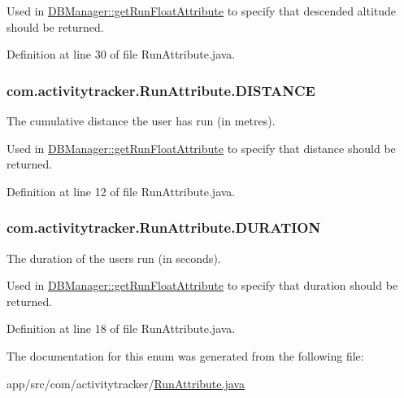 Used in \hyperlink{classcom_1_1activitytracker_1_1_d_b_manager_a666452f1e5862f90c06b0beb9a9fcfdd}{D\+B\+Manager\+::get\+Run\+Float\+Attribute} to specify that descended altitude should be returned. 

Definition at line 30 of file Run\+Attribute.\+java.

\subsubsection[{\texorpdfstring{D\+I\+S\+T\+A\+N\+CE}{DISTANCE}}]{\setlength{\rightskip}{0pt plus 5cm}com.\+activitytracker.\+Run\+Attribute.\+D\+I\+S\+T\+A\+N\+CE}\hypertarget{enumcom_1_1activitytracker_1_1_run_attribute_a90ee541e68e458a0bb3f5ea45fd46ec0}{}\label{enumcom_1_1activitytracker_1_1_run_attribute_a90ee541e68e458a0bb3f5ea45fd46ec0}
The cumulative distance the user has run (in metres).

Used in \hyperlink{classcom_1_1activitytracker_1_1_d_b_manager_a666452f1e5862f90c06b0beb9a9fcfdd}{D\+B\+Manager\+::get\+Run\+Float\+Attribute} to specify that distance should be returned. 

Definition at line 12 of file Run\+Attribute.\+java.

\subsubsection[{\texorpdfstring{D\+U\+R\+A\+T\+I\+ON}{DURATION}}]{\setlength{\rightskip}{0pt plus 5cm}com.\+activitytracker.\+Run\+Attribute.\+D\+U\+R\+A\+T\+I\+ON}\hypertarget{enumcom_1_1activitytracker_1_1_run_attribute_a7adf133b2a62f1f99ffc2adfb7097ec9}{}\label{enumcom_1_1activitytracker_1_1_run_attribute_a7adf133b2a62f1f99ffc2adfb7097ec9}
The duration of the user\textquotesingle{}s run (in seconds).

Used in \hyperlink{classcom_1_1activitytracker_1_1_d_b_manager_a666452f1e5862f90c06b0beb9a9fcfdd}{D\+B\+Manager\+::get\+Run\+Float\+Attribute} to specify that duration should be returned. 

Definition at line 18 of file Run\+Attribute.\+java.



The documentation for this enum was generated from the following file\+:\begin{DoxyCompactItemize}
\item 
app/src/com/activitytracker/\hyperlink{_run_attribute_8java}{Run\+Attribute.\+java}\end{DoxyCompactItemize}
